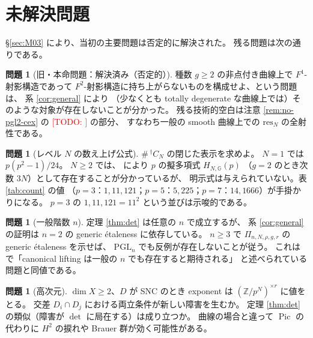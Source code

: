 \documentclass[a4paper,11pt]{ltjsarticle}
\theoremstyle{plain}
\theoremstyle{definition}
\newtheorem{question}[theorem]{問題}
\newcommand{\Todo}[1]{\textcolor{red}{\textsf{[TODO: #1]}}}
\newcommand{\bbZ}{\mathbb{Z}}
\newcommand{\Pic}{\operatorname{Pic}}
\begin{document}
\section{未解決問題}\label{sec:open}

\S\ref{sec:M03} により、当初の主要問題は否定的に解決された。
残る問題は次の通りである。

\begin{question}[旧・本命問題：解決済み（否定的）]\label{q:main}
種数 $g\ge2$ の非点付き曲線上で $F^1$-射影構造であって
$F^2$-射影構造に持ち上がらないものを構成せよ、という問題は、
系 \ref{cor:general} により
（少なくとも totally degenerate な曲線上では）そのような対象が存在しないことが分かった。
残る技術的空白は注意 \ref{rem:no-pgl2-cex} の \Todo{} の部分、
すなわち一般の smooth 曲線上での $\mathrm{res}_N$ の全射性である。
\end{question}

\begin{question}[レベル $N$ の数え上げ公式]\label{q:count}
$\#\,{}^{\dagger}C_N$ の閉じた表示を求めよ。
$N=1$ では $p(p^2-1)/24$。
$N\ge2$ では、\cite[Thm.~E]{Wak2} により $p$ の擬多項式 $H_{N,\mathbb{G}}(p)$
（$g=2$ のとき次数 $3N$）として存在することが分かっているが、
明示式は与えられていない。表 \ref{tab:count} の値
（$p=3$：$1,11,121$；$p=5$：$5,225$；$p=7$：$14,1666$）が手掛かりになる。
$p=3$ の $1,11,121=11^2$ という並びは示唆的である。
\end{question}

\begin{question}[一般階数 $n$]\label{q:rank}
定理 \ref{thm:det} は任意の $n$ で成立するが、
系 \ref{cor:general} の証明は $n=2$ の generic étaleness \cite[Thm.~C]{Wak2} に依存している。
$n\ge3$ で $\Pi_{n,N,\rho,g,r}$ の generic étaleness を示せば、
$\mathrm{PGL}_n$ でも反例が存在しないことが従う。
これは \cite[\S1.6]{Wak2} で「canonical lifting は一般の $n$ でも存在すると期待される」
と述べられている問題と同値である。
\end{question}

\begin{question}[高次元]\label{q:higherdim}
$\dim X\ge2$、$D$ が SNC のとき exponent は $(\bbZ/p^N)^{\times r}$ に値をとる。
交差 $D_i\cap D_j$ における両立条件が新しい障害を生むか。
定理 \ref{thm:det} の類似（障害が $\det$ に局在する）は成り立つか。
曲線の場合と違って $\Pic$ の代わりに $H^2$ の捩れや Brauer 群が効く可能性がある。
\end{question}
\end{document}
